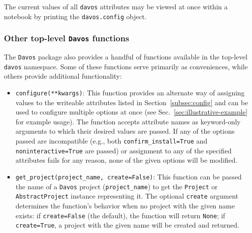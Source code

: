 \documentclass[preprint,12pt,a4paper]{elsarticle}
\begin{document}
\noindent The current values of all \texttt{davos} attributes may be viewed at once within a notebook by printing the \texttt{davos.config} object.


\subsubsection{Other top-level \texttt{Davos} functions}\label{subsec:toplevel}

The \texttt{Davos} package also provides a handful of functions available in the top-level \texttt{davos} namespace.
Some of these functions serve primarily as conveniences, while others provide additional functionality:

\begin{itemize}

\item \texttt{configure(**kwargs)}: This function provides an alternate way of assigning values to the writeable attributes listed in Section~\ref{subsec:config} and can be used to configure multiple options at once (see Sec.~\ref{sec:illustrative-example} for example usage).
  The function accepts attribute names as keyword-only arguments to which their desired values are passed.
  If any of the options passed are incompatible (e.g., both \texttt{confirm\_install=True} and \texttt{noninteractive=True} are passed) or assignment to any of the specified attributes fails for any reason, none of the given options will be modified.

\item \texttt{get\_project(project\_name, create=False)}: This function can be passed the name of a \texttt{Davos} project (\texttt{project\_name}) to get the \texttt{Project} or \texttt{AbstractProject} instance representing it.
  The optional \texttt{create} argument determines the function's behavior when no project with the given name exists: if \texttt{create=False} (the default), the function will return \texttt{None}; if \texttt{create=True}, a project with the given name will be created and returned.


\end{itemize}
\end{document}
